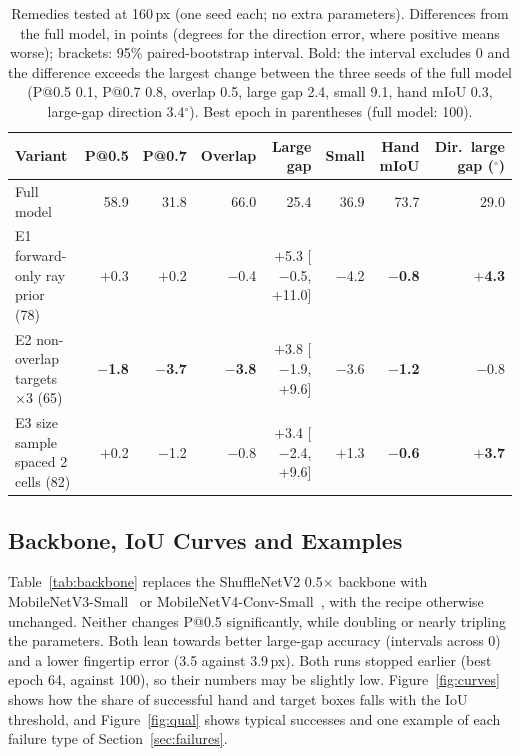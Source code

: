 \begin{table}[h]
  \caption{Remedies tested at 160\,px (one seed each; no extra parameters). Differences from the full model, in points (degrees for the direction error, where positive means worse); brackets: 95\% paired-bootstrap interval. Bold: the interval excludes 0 and the difference exceeds the largest change between the three seeds of the full model (P@0.5 0.1, P@0.7 0.8, overlap 0.5, large gap 2.4, small 9.1, hand mIoU 0.3, large-gap direction 3.4$^\circ$). Best epoch in parentheses (full model: 100).}
  \label{tab:remedies}
  \footnotesize
  \setlength{\tabcolsep}{2.5pt}
  \begin{tabular}{lrrrrrrr}
    \toprule
    Variant & P@0.5 & P@0.7 & Overlap & Large gap & Small & Hand mIoU & Dir.\ large gap ($^\circ$) \\
    \midrule
    Full model & 58.9 & 31.8 & 66.0 & 25.4 & 36.9 & 73.7 & 29.0 \\
    \midrule
    E1 forward-only ray prior (78) & $+$0.3 & $+$0.2 & $-$0.4 & $+$5.3 {\scriptsize[$-$0.5, +11.0]} & $-$4.2 & \textbf{$-$0.8} & \textbf{$+$4.3} \\
    E2 non-overlap targets $\times3$ (65) & \textbf{$-$1.8} & \textbf{$-$3.7} & \textbf{$-$3.8} & $+$3.8 {\scriptsize[$-$1.9, +9.6]} & $-$3.6 & \textbf{$-$1.2} & $-$0.8 \\
    E3 size sample spaced 2 cells (82) & $+$0.2 & $-$1.2 & $-$0.8 & $+$3.4 {\scriptsize[$-$2.4, +9.6]} & $+$1.3 & \textbf{$-$0.6} & \textbf{$+$3.7} \\
    \bottomrule
  \end{tabular}
\end{table}

\subsection{Backbone, IoU Curves and Examples}\label{app:backbone}

Table~\ref{tab:backbone} replaces the ShuffleNetV2 0.5$\times$ backbone with MobileNetV3-Small~\cite{howard2019mobilenetv3} or MobileNetV4-Conv-Small~\cite{qin2024mobilenetv4}, with the recipe otherwise unchanged. Neither changes P@0.5 significantly, while doubling or nearly tripling the parameters. Both lean towards better large-gap accuracy (intervals across 0) and a lower fingertip error (3.5 against 3.9\,px). Both runs stopped earlier (best epoch 64, against 100), so their numbers may be slightly low. Figure~\ref{fig:curves} shows how the share of successful hand and target boxes falls with the IoU threshold, and Figure~\ref{fig:qual} shows typical successes and one example of each failure type of Section~\ref{sec:failures}.

